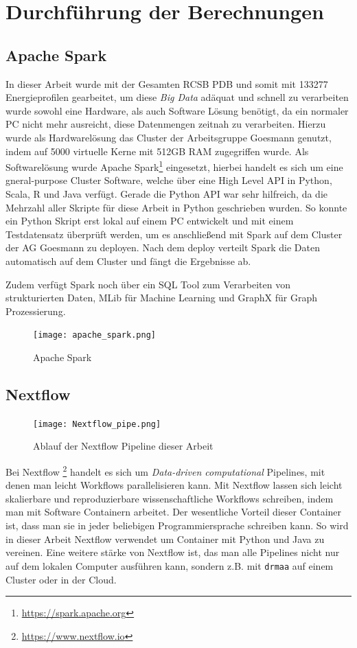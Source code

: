 \section{Durchführung der Berechnungen}


\subsection{Apache Spark}
In dieser Arbeit wurde mit der Gesamten RCSB PDB und somit mit 133277 Energieprofilen gearbeitet, um diese \emph{Big Data} adäquat und schnell zu verarbeiten wurde sowohl eine Hardware, als auch Software Lösung benötigt, da ein normaler PC nicht mehr ausreicht, diese Datenmengen zeitnah zu verarbeiten. Hierzu wurde als Hardwarelösung das Cluster der Arbeitsgruppe Goesmann genutzt, indem auf 5000 virtuelle Kerne mit 512GB RAM zugegriffen wurde. Als Softwarelösung wurde Apache Spark\footnote{\url{https://spark.apache.org}} eingesetzt, hierbei handelt es sich um eine gneral-purpose Cluster Software, welche über eine High Level API in Python, Scala, R und Java verfügt. Gerade die Python API war sehr hilfreich, da die Mehrzahl aller Skripte für diese Arbeit in Python geschrieben wurden. So konnte ein Python Skript erst lokal auf einem PC entwickelt und mit einem Testdatensatz überprüft werden, um es anschließend mit Spark auf dem Cluster der AG Goesmann zu deployen. Nach dem deploy verteilt Spark die Daten automatisch auf dem Cluster und fängt die Ergebnisse ab. 

Zudem verfügt Spark noch über ein SQL Tool zum Verarbeiten von strukturierten Daten, MLib für Machine Learning und GraphX für Graph Prozessierung.

\begin{figure}
\texttt{[image: apache\_spark.png]}
\caption{Apache Spark\protect\footnotemark}
\label{fig:apache_spark}
\end{figure}


\newpage
\subsection{Nextflow}

\begin{figure}
\centering
\texttt{[image: Nextflow\_pipe.png]}
\caption{Ablauf der Nextflow Pipeline dieser Arbeit}
\label{fig:nextflow_pipe}
\end{figure}
Bei Nextflow \footnote{\url{https://www.nextflow.io}} handelt es sich um \emph{Data-driven computational} Pipelines, mit denen man leicht Workflows parallelisieren kann. Mit Nextflow lassen sich leicht skalierbare und reproduzierbare wissenschaftliche Workflows schreiben, indem man mit Software Containern arbeitet. Der wesentliche Vorteil dieser Container ist, dass man sie in jeder beliebigen Programmiersprache schreiben kann. So wird in dieser Arbeit Nextflow verwendet um Container mit Python und Java zu vereinen. 
Eine weitere stärke von Nextflow ist, das man alle Pipelines nicht nur auf dem lokalen Computer ausführen kann, sondern z.B. mit \texttt{drmaa} auf einem Cluster oder in der Cloud.


